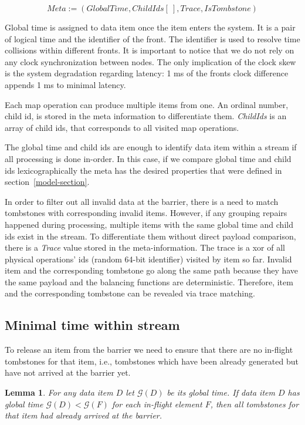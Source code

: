 \[Meta := (GlobalTime, ChildIds[\:], Trace, IsTombstone)\]

Global time is assigned to data item once the item enters the system. It is a pair of logical time and the identifier of the front. The identifier is used to resolve time collisions within different fronts. It is important to notice that we do not rely on any clock synchronization between nodes. The only implication of the clock skew is the system degradation regarding latency: 1 ms of the fronts clock difference appends 1 ms to minimal latency.

Each map operation can produce multiple items from one.  An ordinal number, child id, is stored in the meta information to differentiate them. {\it ChildIds} is an array of child ids, that corresponds to all visited map operations.

The global time and child ids are enough to identify data item within a stream if all processing is done in-order. In this case, if we compare global time and child ids lexicographically the meta has the desired properties that were defined in section~\ref{model-section}. 

In order to filter out all invalid data at the barrier, there is a need to match tombstones with corresponding invalid items. However, if any grouping repairs happened during processing, multiple items with the same global time and child ids exist in the stream. To differentiate them without direct payload comparison, there is a {\it Trace} value stored in the meta-information. The trace is a xor of all physical operations' ids (random 64-bit identifier) visited by item so far. Invalid item and the corresponding tombstone go along the same path because they have the same payload and the balancing functions are deterministic. Therefore, item and the corresponding tombstone can be revealed via trace matching. 

\label{mininal-time}

\subsection{Minimal time within stream}

To release an item from the barrier we need to ensure that there are no in-flight tombstones for that item, i.e., tombstones which have been already generated but have not arrived at the barrier yet.

\newtheorem{minimal-time-claim}{Lemma}

\begin{minimal-time-claim}
  For any data item $D$ let $\mathcal{G} (D)$ be its global time. If data item $D$ has global time $\mathcal{G} (D) < \mathcal{G} (F)$ for each in-flight element $F$, then all tombstones for that item had already arrived at the barrier.
\end{minimal-time-claim}

